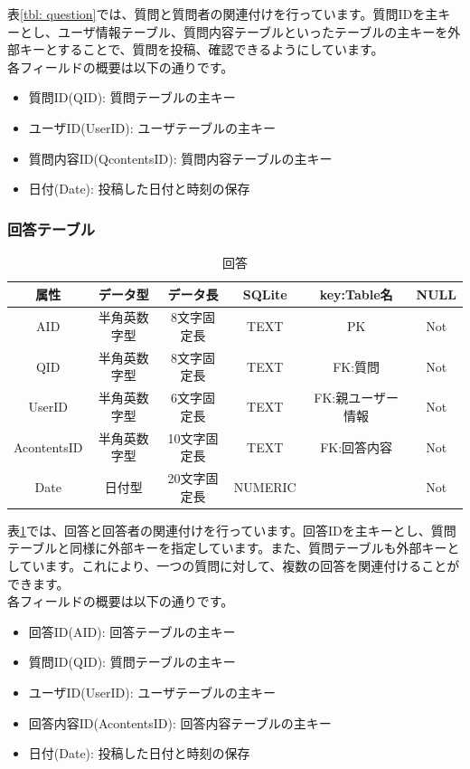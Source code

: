 \documentclass[a4j]{jarticle}
\begin{document}
表\ref{tbl: question}では、質問と質問者の関連付けを行っています。質問IDを主キーとし、ユーザ情報テーブル、質問内容テーブルといったテーブルの主キーを外部キーとすることで、質問を投稿、確認できるようにしています。\\
各フィールドの概要は以下の通りです。
\begin{itemize}
  \item 質問ID(QID):
  質問テーブルの主キー
  \item ユーザID(UserID):
  ユーザテーブルの主キー
  \item 質問内容ID(QcontentsID):
  質問内容テーブルの主キー
  \item 日付(Date):
  投稿した日付と時刻の保存
\end{itemize}

\subsubsection{回答テーブル}
\begin{table}[H]
    \caption{回答}
    \label{tbl: answer}
    \begin{center}
        \begin{tabular}{|c|c|c|c|c|c|} \hline
            属性 & データ型 & データ長 & SQLite & key:Table名 & NULL\\ \hline \hline
            AID & 半角英数字型 & 8文字固定長 & TEXT & PK & Not\\ \hline
            QID & 半角英数字型 & 8文字固定長 & TEXT & FK:質問 & Not\\ \hline
            UserID & 半角英数字型 & 6文字固定長 & TEXT & FK:親ユーザー情報 & Not\\ \hline
            AcontentsID & 半角英数字型 & 10文字固定長 & TEXT & FK:回答内容 & Not\\ \hline
            Date & 日付型 & 20文字固定長 & NUMERIC & & Not\\ \hline
        \end{tabular}
    \end{center}
\end{table}
表\ref{tbl: answer}では、回答と回答者の関連付けを行っています。回答IDを主キーとし、質問テーブルと同様に外部キーを指定しています。また、質問テーブルも外部キーとしています。これにより、一つの質問に対して、複数の回答を関連付けることができます。\\
各フィールドの概要は以下の通りです。
\begin{itemize}
  \item 回答ID(AID):
  回答テーブルの主キー
  \item 質問ID(QID):
  質問テーブルの主キー
  \item ユーザID(UserID):
  ユーザテーブルの主キー
  \item 回答内容ID(AcontentsID):
  回答内容テーブルの主キー
  \item 日付(Date):
  投稿した日付と時刻の保存
\end{itemize}
\end{document}
